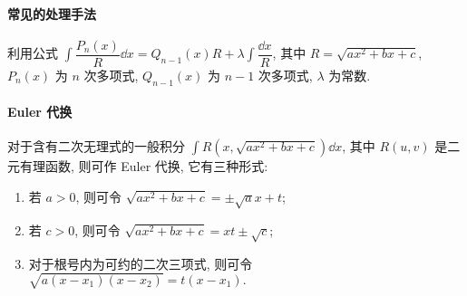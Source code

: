 \paragraph{常见的处理手法}利用公式 $\displaystyle\int\dfrac{P_n(x)}{R}\dd x=Q_{n-1}(x)R+\lambda\int\dfrac{\dd x}{R}$, 其中 $R=\sqrt{ax^2+bx+c}$, $P_n(x)$ 为 $n$ 次多项式,
$Q_{n-1}(x)$ 为 $n-1$ 次多项式, $\lambda$ 为常数.

\paragraph{Euler 代换}
对于含有二次无理式的一般积分 $ \displaystyle\int R\left(x, \sqrt{a x^{2}+b x+c}\right) \dd  x$, 其中 $ R(u, v) $ 是二元有理函数, 则可作 Euler 代换, 它有三种形式:
\begin{enumerate}[label=(\arabic{*})]
    \item 若 $ a>0 $, 则可令 $ \sqrt{a x^{2}+b x+c}=\pm \sqrt{a} x+t$;
    \item 若 $ c>0 $, 则可令 $ \sqrt{a x^{2}+b x+c}=x t \pm \sqrt{c}$;
    \item 对于根号内为可约的二次三项式, 则可令 $ \sqrt{a\left(x-x_{1}\right)\left(x-x_{2}\right)}=t\left(x-x_{1}\right).$
\end{enumerate}

